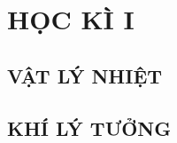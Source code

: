 \documentclass[11pt,a4paper,onecolumn,titlepage,twoside,openany]{book}
\begin{document}
	\renewcommand{\chaptername}{Chương} %
	\setcounter{page}{0}
	\FULLWIDTH
	\muclucchinh
	\clearpage%
\part{HỌC KÌ I}
\setcounter{chapter}{0}  
\chapter{VẬT LÝ NHIỆT}
	
\newpage	
\newpage	
\newpage	
\newpage	
\newpage	
\newpage	
\setcounter{chapter}{1}
\chapter{KHÍ LÝ TƯỞNG}
	
\newpage	
\newpage	
\newpage	
\newpage	
\newpage	
\newpage	
\newpage	
\end{document}
